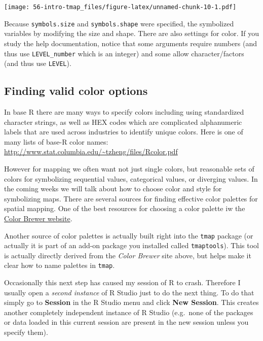 \documentclass[
]{book}
\newenvironment{rmdcaution}[1]
  {
  \begin{itemize}
  \renewcommand{\labelitemi}{
    \raisebox{-.7\height}[0pt][0pt]{
      {\setkeys{Gin}{width=3em,keepaspectratio}\texttt{[image: images/\#1]}}
    }
  }
  \setlength{\fboxsep}{1em}
  \begin{caution}
  \item
  }
  {
  \end{caution}
  \end{itemize}
  }
\begin{document}
\texttt{[image: 56-intro-tmap\_files/figure-latex/unnamed-chunk-10-1.pdf]}

Because \texttt{symbols.size} and \texttt{symbols.shape} were specified, the symbolized variables by modifying the size and shape. There are also settings for color. If you study the help documentation, notice that some arguments require numbers (and thus use \texttt{LEVEL\_number} which is an integer) and some allow character/factors (and thus use \texttt{LEVEL}).

\hypertarget{finding-valid-color-options}{%
\subsection{Finding valid color options}\label{finding-valid-color-options}}

In base R there are many ways to specify colors including using standardized character strings, as well as HEX codes which are complicated alphanumeric labels that are used across industries to identify unique colors. Here is one of many lists of base-R color names: \url{http://www.stat.columbia.edu/~tzheng/files/Rcolor.pdf}

However for mapping we often want not just single colors, but reasonable sets of colors for symbolizing sequential values, categorical values, or diverging values. In the coming weeks we will talk about how to choose color and style for symbolizing maps. There are several sources for finding effective color palettes for spatial mapping. One of the best resources for choosing a color palette iw the \href{https://colorbrewer2.org/\#type=sequential\&scheme=BuGn\&n=3}{Color Brewer website}.

Another source of color palettes is actually built right into the \texttt{tmap} package (or actually it is part of an add-on package you installed called \texttt{tmaptools}). This tool is actually directly derived from the \emph{Color Brewer} site above, but helps make it clear how to name palettes in \texttt{tmap}.

\begin{rmdcaution}{caution}
Occasionally this next step has caused my session of R to crash. Therefore I usually open a \emph{second instance} of R Studio just to do the next thing. To do that simply go to \textbf{Session} in the R Studio menu and click \textbf{New Session}. This creates another completely independent instance of R Studio (e.g.~none of the packages or data loaded in this current session are present in the new session unless you specify them).

\end{rmdcaution}
\end{document}
